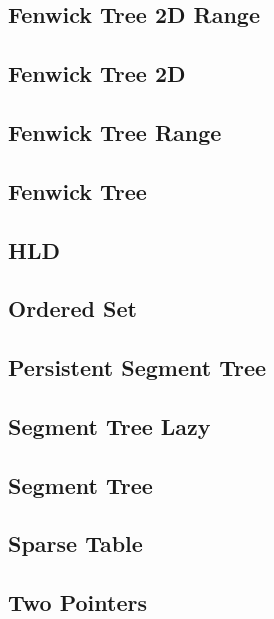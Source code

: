 \documentclass[a4paper,10pt]{article}
\begin{document}
\subsection{Fenwick Tree 2D Range}

\subsection{Fenwick Tree 2D}

\subsection{Fenwick Tree Range}

\subsection{Fenwick Tree}

\subsection{HLD}

\subsection{Ordered Set}

\subsection{Persistent Segment Tree}

\subsection{Segment Tree Lazy}

\subsection{Segment Tree}

\subsection{Sparse Table}

\subsection{Two Pointers}

\end{document}
